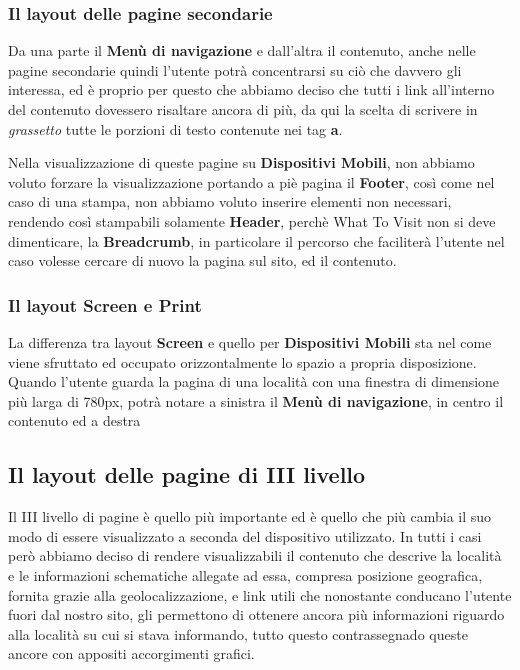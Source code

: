 \subsubsection{Il layout delle pagine secondarie}\label{sec:Pres-IIliv-sec}
Da una parte il \textbf{Menù di navigazione} e dall'altra il contenuto, anche nelle pagine secondarie quindi l'utente potrà concentrarsi su ciò che davvero gli interessa, ed è proprio per questo che abbiamo deciso che tutti i link all'interno del contenuto dovessero risaltare ancora di più, da qui la scelta di scrivere in \textit{grassetto} tutte le porzioni di testo contenute nei tag \textbf{a}.

Nella visualizzazione di queste pagine su \textbf{Dispositivi Mobili}, non abbiamo voluto forzare la visualizzazione portando a piè pagina il \textbf{Footer}, così come nel caso di una stampa, non abbiamo voluto inserire elementi non necessari, rendendo così stampabili solamente \textbf{Header}, perchè What To Visit non si deve dimenticare, la \textbf{Breadcrumb}, in particolare il percorso che faciliterà l'utente nel caso volesse cercare di nuovo la pagina sul sito, ed il contenuto.

\subsubsection{Il layout Screen e Print}\label{sec:Pres-IIliv-screenPrint}
La differenza tra layout \textbf{Screen} e quello per \textbf{Dispositivi
Mobili} sta nel come viene sfruttato ed occupato orizzontalmente lo spazio a
propria disposizione.
Quando l'utente guarda la pagina di una località con una finestra di dimensione più larga di 780px, potrà notare a sinistra il \textbf{Menù di navigazione}, in centro il contenuto ed a destra

\subsection{Il layout delle pagine di III livello}\label{sec:Pres-IIIliv}
Il III livello di pagine è quello più importante ed è quello che più cambia il
suo modo di essere visualizzato a seconda del dispositivo utilizzato.
In tutti i casi però abbiamo deciso di rendere visualizzabili il contenuto che
descrive la località e le informazioni schematiche allegate ad essa, compresa
posizione geografica, fornita grazie alla geolocalizzazione, e link utili che
nonostante conducano l'utente fuori dal nostro sito, gli permettono di
ottenere ancora più informazioni riguardo alla località su cui si stava
informando, tutto questo contrassegnado queste ancore con appositi
accorgimenti grafici.

